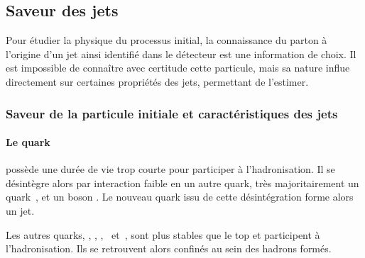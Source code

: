 \subsection{Saveur des jets}\label{chapter-JERC-section-jets_reco-subsec-flavor}
Pour étudier la physique du processus initial, la connaissance du parton à l'origine d'un jet ainsi identifié dans le détecteur est une information de choix.
Il est impossible de connaître avec certitude cette particule, mais sa nature influe directement sur certaines propriétés des jets, permettant de l'estimer.
\subsubsection{Saveur de la particule initiale et caractéristiques des jets}
\paragraph{Le quark~\quarkt} possède une durée de vie trop courte pour participer à l'hadronisation. Il se désintègre alors par interaction faible en un autre quark, très majoritairement un quark~\quarkb, et un boson \Wboson. Le nouveau quark issu de cette désintégration forme alors un jet.
\par Les autres quarks, \quarkd, \quarku, \quarks, \quarkc\ et~\quarkb, sont plus stables que le top et participent à l'hadronisation.
Ils se retrouvent alors confinés au sein des hadrons formés.
